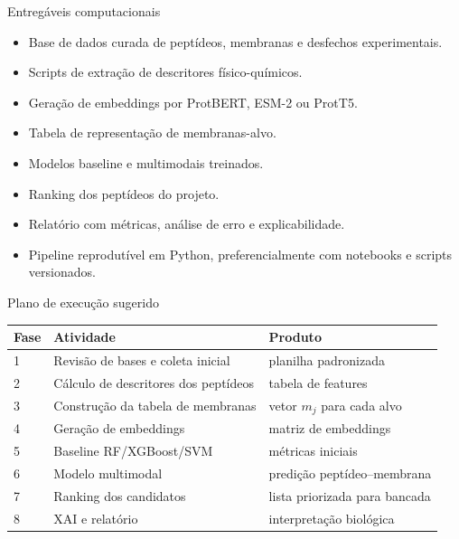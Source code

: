 \documentclass[aspectratio=169,10pt]{beamer}
\begin{document}
\begin{frame}{Entregáveis computacionais}
\begin{itemize}
  \item Base de dados curada de peptídeos, membranas e desfechos experimentais.
  \item Scripts de extração de descritores físico-químicos.
  \item Geração de embeddings por ProtBERT, ESM-2 ou ProtT5.
  \item Tabela de representação de membranas-alvo.
  \item Modelos baseline e multimodais treinados.
  \item Ranking dos peptídeos do projeto.
  \item Relatório com métricas, análise de erro e explicabilidade.
  \item Pipeline reprodutível em Python, preferencialmente com notebooks e scripts versionados.
\end{itemize}
\end{frame}

\begin{frame}{Plano de execução sugerido}
\small
\begin{center}
\begin{tabular}{p{1.2cm}p{5.5cm}p{5.5cm}}
\toprule
\textbf{Fase} & \textbf{Atividade} & \textbf{Produto} \\
\midrule
1 & Revisão de bases e coleta inicial & planilha padronizada \\
2 & Cálculo de descritores dos peptídeos & tabela de features \\
3 & Construção da tabela de membranas & vetor $m_j$ para cada alvo \\
4 & Geração de embeddings & matriz de embeddings \\
5 & Baseline RF/XGBoost/SVM & métricas iniciais \\
6 & Modelo multimodal & predição peptídeo--membrana \\
7 & Ranking dos candidatos & lista priorizada para bancada \\
8 & XAI e relatório & interpretação biológica \\
\bottomrule
\end{tabular}
\end{center}
\end{frame}
\end{document}
